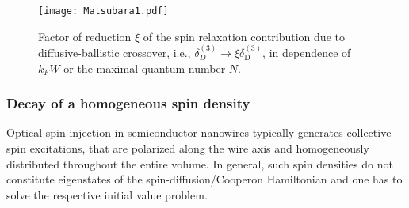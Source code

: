 \documentclass[superscriptaddress,noshowpacs,noshowkeys, twocolumn, floatfix,aps, prb,reprint]{revtex4-1}
\begin{document}
\begin{figure}[t]
\texttt{[image: Matsubara1.pdf]}
\caption{Factor of reduction $\xi$ of the spin relaxation contribution due to diffusive-ballistic crossover, i.e., $\delta_{D}^{(3)}\rightarrow\xi \delta_\text{D}^{(3)}$, in dependence of $k_F W$ or the maximal quantum number $N$.}
\label{fig:matsubara}
\end{figure}








\subsubsection{Decay of a homogeneous spin density}\label{sec:hom}

Optical spin injection in semiconductor nanowires typically generates collective spin excitations, that are polarized along the wire axis and homogeneously distributed throughout the entire volume.\cite{Furthmeier2016} 
In general, such spin densities do not constitute eigenstates of the spin-diffusion/Cooperon Hamiltonian and one has to solve the respective initial value problem.
\end{document}
